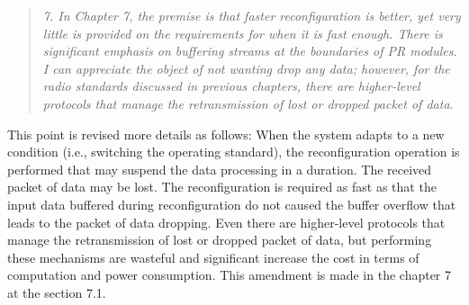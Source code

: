 \documentclass{article}
\begin{document}
\begin{quote}
\emph{7. In Chapter 7, the premise is that faster reconfiguration is better, yet very little is provided on the requirements for when it is fast enough. There is significant emphasis on buffering streams at the boundaries of PR modules. I can appreciate the object of not wanting drop any data; however, for the radio standards discussed in previous chapters, there are higher-level protocols that manage the retransmission of lost or dropped packet of data.}
\end{quote}
This point is revised more details as follows:
When the system adapts to a new condition (i.e., switching the operating standard), the reconfiguration operation is performed that may suspend the data processing in a duration. The received packet of data may be lost. 
The reconfiguration is required as fast as that the input data buffered during reconfiguration do not caused the buffer overflow that leads to the packet of data dropping. Even there are higher-level protocols that manage the retransmission of lost or dropped packet of data, but performing these mechanisms are wasteful and significant increase the cost in terms of computation and power consumption.
This amendment is made in the chapter 7 at the section 7.1.
\end{document}
